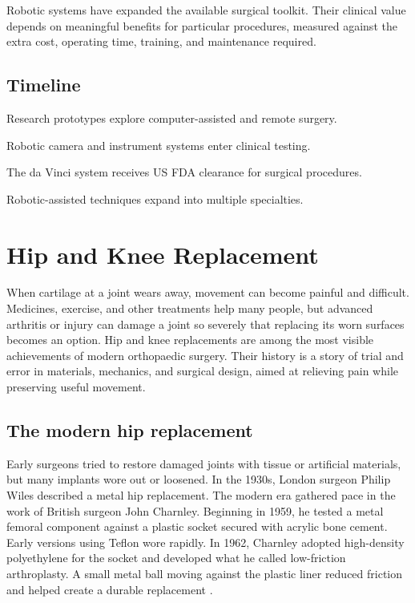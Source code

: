 \documentclass[12pt,oneside]{book}
\begin{document}
Robotic systems have expanded the available surgical toolkit. Their clinical
value depends on meaningful benefits for particular procedures, measured
against the extra cost, operating time, training, and maintenance required.

\section*{Timeline}
\begin{description}[leftmargin=2.3cm,style=nextline]
  \item[1980s] Research prototypes explore computer-assisted and remote surgery.
  \item[1990s] Robotic camera and instrument systems enter clinical testing.
  \item[2000] The da Vinci system receives US FDA clearance for surgical procedures.
  \item[2000s onward] Robotic-assisted techniques expand into multiple specialties.
\end{description}
\chapter[Hip and Knee Replacement]{Hip and Knee Replacement}

When cartilage at a joint wears away, movement can become painful and
difficult. Medicines, exercise, and other treatments help many people, but
advanced arthritis or injury can damage a joint so severely that replacing
its worn surfaces becomes an option. Hip and knee replacements are among
the most visible achievements of modern orthopaedic surgery. Their history
is a story of trial and error in materials, mechanics, and surgical design,
aimed at relieving pain while preserving useful movement.

\section{The modern hip replacement}
Early surgeons tried to restore damaged joints with tissue or artificial
materials, but many implants wore out or loosened. In the 1930s, London
surgeon Philip Wiles described a metal hip replacement. The modern era
gathered pace in the work of British surgeon John Charnley. Beginning in
1959, he tested a metal femoral component against a plastic socket secured
with acrylic bone cement. Early versions using Teflon wore rapidly. In
1962, Charnley adopted high-density polyethylene for the socket and
developed what he called low-friction arthroplasty. A small metal ball
moving against the plastic liner reduced friction and helped create a
durable replacement \cite{hipArthroplastyHistory}.
\end{document}
